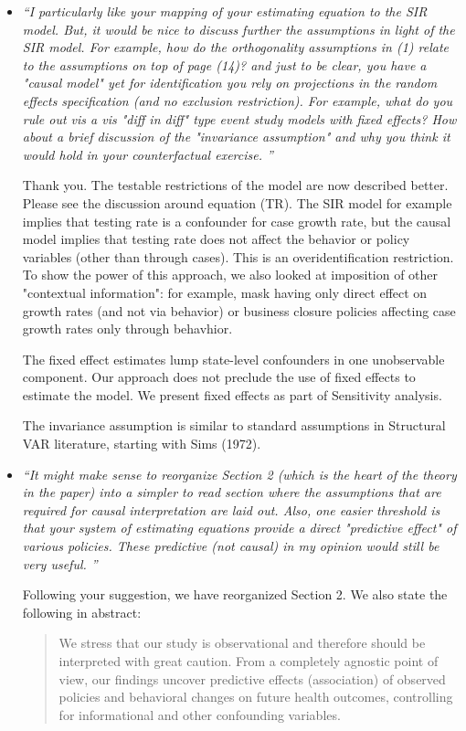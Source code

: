 \documentclass[11pt]{article}
\begin{document}
\begin{itemize}

\item   \textit{``I particularly like your mapping of your estimating equation to the SIR model. But, it would be nice to discuss further the assumptions in light of the SIR model. For example, how do the orthogonality assumptions in (1) relate to the assumptions on top of page (14)? and just to be clear, you have a "causal model" yet for identification you rely on projections in the random effects specification (and no exclusion restriction). For example, what do you rule out vis a vis "diff in diff" type event study models with fixed effects? How about a brief discussion of the "invariance assumption" and why you think it would hold in your counterfactual exercise. ''}

Thank you. The testable restrictions of the model are now described better.  Please see the discussion around equation (TR). The SIR model
for example implies that testing rate is a confounder for case growth rate, but the causal model implies  that testing rate
does not affect the behavior or policy variables (other than through cases). This is an overidentification restriction.
To show the power of this approach, we also looked at imposition of other "contextual information": for example, mask
having only direct effect on growth rates (and not via behavior) or business closure policies affecting case growth rates
only through behavhior.

The fixed effect estimates lump state-level confounders in one unobservable component.  Our approach does not preclude
the use of fixed effects to estimate the model. We present fixed effects as part of Sensitivity analysis.

The invariance assumption is similar to standard assumptions in Structural VAR literature, starting with Sims (1972).
 

\item   \textit{``It might make sense to reorganize Section 2 (which is the heart of the theory in the paper) into a simpler to read section  where the assumptions that are required for causal interpretation are laid out. Also, one easier threshold is that your system of estimating equations provide a direct "predictive effect" of various policies. These predictive (not causal) in my opinion would still be very useful. ''}

Following your suggestion, we have reorganized Section 2. 
 We also state the following in abstract:
 \begin{quote}
 We stress that our study is observational and therefore should be interpreted with great caution. 
 From a completely agnostic point of view,
our findings uncover predictive effects (association) of observed policies and behavioral changes  on future health outcomes,
 controlling for informational and other confounding variables.
\end{quote}

\end{itemize}
\end{document}
